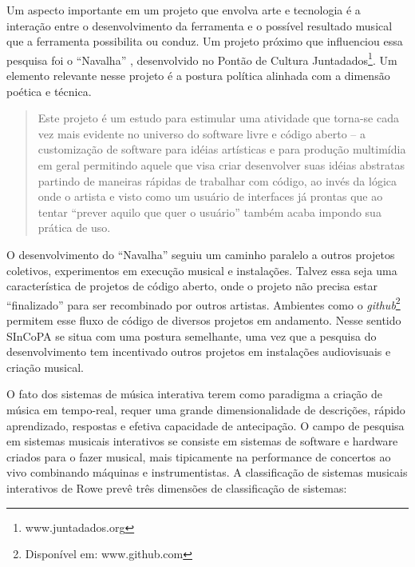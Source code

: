 \documentclass{ppgmus}
\begin{document}
Um aspecto importante em um projeto que envolva arte e tecnologia é a interação
entre o desenvolvimento da ferramenta e o possível resultado musical que a ferramenta
possibilita ou conduz.
Um projeto próximo que influenciou essa pesquisa foi o ``Navalha'' \cite{navalha}, 
desenvolvido no Pontão de Cultura Juntadados\footnote{www.juntadados.org}.
Um elemento relevante nesse projeto é a postura política alinhada com a dimensão
poética e técnica.

\begin{quote}
Este projeto é um estudo para estimular uma atividade que torna-se cada vez mais evidente no universo 
do software livre e código aberto – a customização de software para idéias artísticas e para produção 
multimídia em geral permitindo aquele que visa criar desenvolver suas idéias abstratas partindo de maneiras 
rápidas de trabalhar com código, ao invés da lógica onde o artista e visto como um usuário de interfaces já 
prontas que ao tentar “prever aquilo que quer o usuário” também acaba impondo sua prática de uso. \cite{navalha}
\end{quote}

O desenvolvimento do ``Navalha'' seguiu um caminho paralelo a outros projetos coletivos, experimentos em 
execução musical e instalações. Talvez essa seja uma característica de projetos de código aberto, onde
o projeto não precisa estar ``finalizado'' para ser recombinado por outros artistas. Ambientes como o 
\textit{github}\footnote{Disponível em: www.github.com} permitem esse fluxo de código de diversos projetos
em andamento. Nesse sentido SInCoPA se situa com uma postura semelhante, uma vez que a pesquisa do desenvolvimento
tem incentivado outros projetos em instalações audiovisuais e criação musical.



O fato dos sistemas de música interativa terem como
paradigma a criação de música em tempo-real,  requer uma grande
dimensionalidade de descrições, rápido aprendizado, respostas e
efetiva capacidade de antecipação. O campo de pesquisa em sistemas
musicais interativos \cite{rowe93:interactive} se consiste em sistemas de software e
hardware criados para o fazer musical, mais tipicamente na performance
de concertos ao vivo combinando máquinas e instrumentistas. 
A classificação de sistemas
musicais interativos de Rowe prevê três dimensões de classificação de
sistemas:
\end{document}
